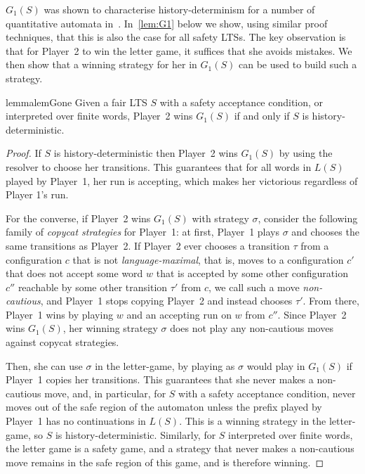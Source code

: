 \documentclass[10pt,a4paper]{amsart}
\theoremstyle{definition}
\numberwithin{equation}{section}
\newcommand{\strat}{\sigma}
\newcommand{\lts}{S}
\begin{document}
$G_1(\lts)$ was shown to characterise history-determinism for a number of quantitative automata in~\cite{BL22}. In~\cref{lem:G1} below we show, using similar proof techniques, that this is also the case for all safety LTSs. The key observation is that for Player~2 to win the letter game, it suffices that she avoids mistakes. We then show that a winning strategy for her in $G_1(\lts)$ can be used to build such a strategy.

\begin{restatable}{lemma}{lemGone}\label{lem:G1}
Given a fair LTS $\lts$ with a safety acceptance condition, or interpreted over finite words, Player~2 wins $G_1(\lts)$ if and only if $\lts$ is history-deterministic.
\end{restatable}

   
\begin{proof}
If $\lts$ is history-deterministic then Player~2 wins $G_1(\lts)$ by using the resolver to choose her transitions. This guarantees that for all words in $L(\lts)$ played by Player~1, her run is accepting, which makes her victorious regardless of Player 1's run.


For the converse, if Player~2 wins $G_1(\lts)$ with strategy $\sigma$, consider the following family of \textit{copycat strategies} for Player~1: at first, Player~1 plays $\sigma$ and chooses the same transitions as Player~2.  If Player~2 ever chooses a transition $\tau$ from a configuration $c$ that is not \emph{language-maximal}, that is, moves to a configuration $c'$ that does not accept some word $w$ that is accepted by some other configuration $c''$ reachable by some other transition $\tau'$ from $c$, we call such a move \emph{non-cautious}, and Player~1 stops copying Player~2 and instead chooses $\tau'$. From there, Player~1 wins by playing $w$ and an accepting run on $w$ from $c''$. Since Player~2 wins $G_1(\lts)$, her winning strategy $\strat$ does not play any non-cautious moves against copycat strategies. 

Then, she can use $\strat$ in the letter-game, by playing as $\strat$ would play in $G_1(\lts)$ if Player~1 copies her transitions. This guarantees that she never makes a non-cautious move, and, in particular, for $\lts$ with a safety acceptance condition, never moves out of the safe region of the automaton unless the prefix played by Player~1 has no continuations in $L(\lts)$. This is a winning strategy in the letter-game, so $\lts$ is history-deterministic.
Similarly, for $\lts$ interpreted over finite words, the letter game is a safety game, and a strategy that never makes a non-cautious move remains in the safe region of this game, and is therefore winning.
\end{proof}
 
\end{document}
